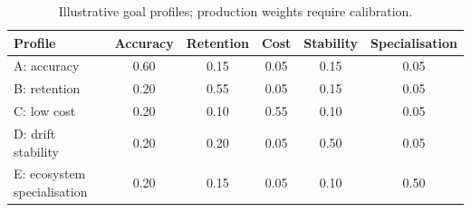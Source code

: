 \documentclass[10pt]{article}
\begin{document}
\begin{table}[h]
\centering
\caption{Illustrative goal profiles; production weights require calibration.}
\begin{tabular}{lccccc}
\toprule
Profile & Accuracy & Retention & Cost & Stability & Specialisation \\
\midrule
A: accuracy & 0.60 & 0.15 & 0.05 & 0.15 & 0.05 \\
B: retention & 0.20 & 0.55 & 0.05 & 0.15 & 0.05 \\
C: low cost & 0.20 & 0.10 & 0.55 & 0.10 & 0.05 \\
D: drift stability & 0.20 & 0.20 & 0.05 & 0.50 & 0.05 \\
E: ecosystem specialisation & 0.20 & 0.15 & 0.05 & 0.10 & 0.50 \\
\bottomrule
\end{tabular}
\end{table}
\end{document}
